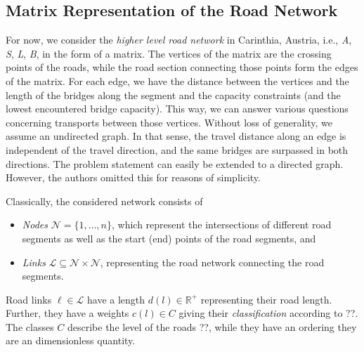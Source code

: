%
\subsection{Matrix Representation of the Road Network}

For now, we consider the \textit{higher level road network} in Carinthia, Austria,
i.e., \textit{A}, \textit{S}, \textit{L}, \textit{B}, in the  form of a matrix.
The vertices of the matrix are the crossing points of the roads, while
the road section connecting those points form the edges of the matrix.
For each edge, we have the distance between the vertices and the length of the bridges along the segment
and the capacity constraints (and the lowest encountered bridge capacity).
This way, we can answer various questions concerning transports between those vertices.
Without loss of generality, we assume an undirected graph.
In that sense, the travel distance along an edge is independent of
the travel direction, and  the same bridges are surpassed in both directions.
The problem statement can
easily be extended to a directed graph. However, the authors omitted this for reasons of simplicity.

Classically,  the considered network consists of
\begin{itemize}
  \item \emph{Nodes} $\mathcal{N}=\{1,\ldots, n\}$, which represent the intersections of different road segments as
  well as the start (end) points of the road segments, and

  \item \emph{Links} $\mathcal{L} \subseteq \mathcal{N} \times \mathcal{N}$,
  representing the road network connecting the road segments.

\end{itemize}

Road links $\ell \in \mathcal{L}$ have a length $d(l)\in \mathbb{R}^{+}$ representing their road length.
Further, they have a weights $c(l) \in C$ giving their \emph{classification} according to {\color{red} ??}.
The classes $C$ describe the level of the roads {\color{red} ??},
while they have an ordering they are an dimensionless quantity.

